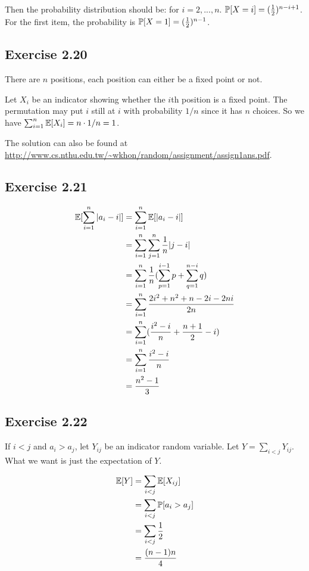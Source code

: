 Then the probability distribution should be: for $i = 2,...,n$. $\P[X = i] = (\frac{1}{2})^{n-i+1}$.
For the first item, the probability is $\P[X = 1] = (\frac{1}{2})^{n-1}$.

\subsection*{Exercise 2.20}

There are $n$ positions, each position can either be a fixed point or not.

Let $X_i$ be an indicator showing whether the $i$th position is a fixed point.
The permutation may put $i$ still at $i$ with probability $1/n$ since it has
$n$ choices. So we have $\sum_{i=1}^{n}\E[X_i] = n \cdot 1/n = 1$.

The solution can also be found at \url{http://www.cs.nthu.edu.tw/~wkhon/random/assignment/assign1ans.pdf}.

\subsection*{Exercise 2.21}

\begin{equation*}
\begin{split}
\E[\sum_{i=1}^{n} |a_i -i|] & = \sum_{i=1}^{n} \E[|a_i - i|] \\
& = \sum_{i=1}^{n} \sum_{j=1}^{n} \frac{1}{n} |j-i| \\
& = \sum_{i=1}^{n} \frac{1}{n} (\sum_{p = 1}^{i-1} p + \sum_{q=1}^{n-i}q) \\
& = \sum_{i=1}^{n} \frac{2i^2 + n^2 + n - 2i - 2ni}{2n} \\
& = \sum_{i=1}^{n} (\frac{i^2-i}{n} + \frac{n + 1}{2} - i) \\
& = \sum_{i=1}^{n} \frac{i^2 - i}{n} \\
& = \frac{n^2 - 1}{3}
\end{split}
\end{equation*}

\subsection*{Exercise 2.22}

If $i < j$ and $a_i > a_j$, let $Y_{ij}$ be an indicator random variable.
Let $Y = \sum_{i<j} Y_{ij}$. What we want is just the expectation of $Y$.

\begin{equation*}
\begin{split}
\E[Y] & = \sum_{i<j} \E[X_{ij}] \\
& = \sum_{i<j} \P[a_i > a_ j] \\
& = \sum_{i<j} \frac{1}{2} \\
& = \frac{(n-1)n}{4}
\end{split}
\end{equation*}

